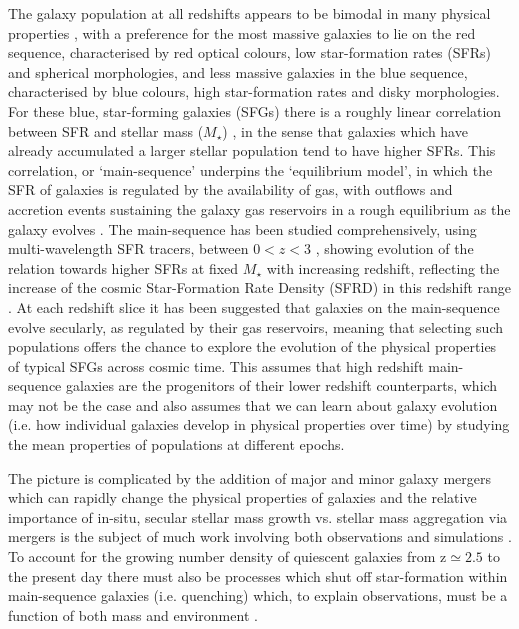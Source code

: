 \documentclass[fleqn,usenatbib]{mn2e}
\begin{document}
The galaxy population at all redshifts appears to be bimodal in many physical properties \citep[e.g. as described in][]{Dekel2006}, with a preference for the most massive galaxies to lie on the red sequence, characterised by red optical colours, low star-formation rates (SFRs) and spherical morphologies, and less massive galaxies in the blue sequence, characterised by blue colours, high star-formation rates and disky morphologies. 
For these blue, star-forming galaxies (SFGs) there is a roughly linear correlation between SFR and stellar mass ($M_{\star}$) \citep[e.g.][]{Daddi2007,Noeske2007,Elbaz2007}, in the sense that galaxies which have already accumulated a larger stellar population tend to have higher SFRs.
This correlation, or `main-sequence' underpins the `equilibrium model', in which the SFR of galaxies is regulated by the availability of gas, with outflows and accretion events sustaining the galaxy gas reservoirs in a rough equilibrium as the galaxy evolves \citep[e.g.][]{Dave2012,Lilly2013,Saintonge2013}.
The main-sequence has been studied comprehensively, using multi-wavelength SFR tracers, between $0 < z < 3$ \citep[e.g.][]{Rodighiero2011,Karim2011,Whitaker2012,Behroozi2013b,Whitaker2014,Rodighiero2014,Speagle2014,Pannella2014,Sobral2014,Sparre2015,Lee2015,Schreiber2015,Renzini2015,Nelson2016}, showing evolution of the relation towards higher SFRs at fixed $M_{\star}$ with increasing redshift, reflecting the increase of the cosmic Star-Formation Rate Density (SFRD) in this redshift range \citep{Madau_2014}.
At each redshift slice it has been suggested that galaxies on the main-sequence evolve secularly, as regulated by their gas reservoirs, meaning that selecting such populations offers the chance to explore the evolution of the physical properties of typical SFGs across cosmic time.
This assumes that high redshift main-sequence galaxies are the progenitors of their lower redshift counterparts, which may not be the case \citep[e.g.][]{Gladders2013,Kelson2014,Abramson2016b} and also assumes that we can learn about galaxy evolution (i.e. how individual galaxies develop in physical properties over time) by studying the mean properties of populations at different epochs. 

The picture is complicated by the addition of major and minor galaxy mergers which can rapidly change the physical properties of galaxies \citep[e.g.][]{Toomre1977,Lotz2008,Conselice2011,Conselice2014} and the relative importance of in-situ, secular stellar mass growth vs. stellar mass aggregation via mergers is the subject of much work involving both observations and simulations \citep[e.g.][]{Robaina2009,Kaviraj2012,Stott2013,Lofthouse2016,Qu2016}. 
To account for the growing number density of quiescent galaxies from z$\simeq2.5$ to the present day \citep[e.g.][]{Bell2004,Faber2007,Brown2007,Ilbert2010,Brammer2011,Muzzin2013,Buitrago2013} there must also be processes which shut off star-formation within main-sequence galaxies (i.e. quenching) which, to explain observations, must be a function of both mass and environment \citep{Peng2010,Darvish2016}.
\end{document}

